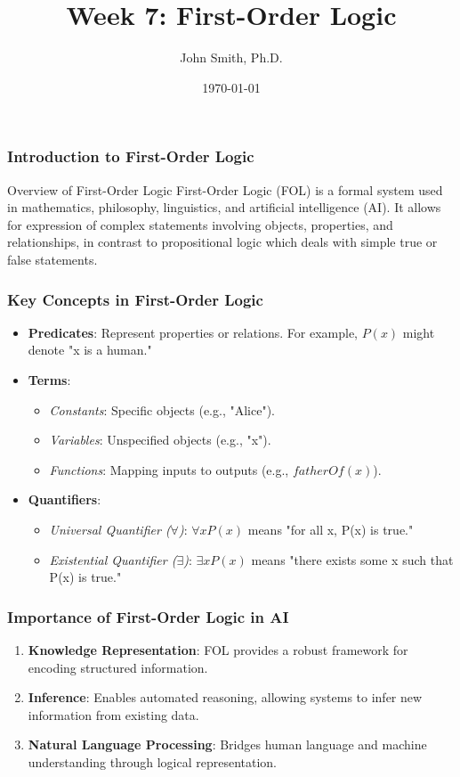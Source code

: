 \documentclass[aspectratio=169]{beamer}
\title[Week 7: First-Order Logic]{Week 7: First-Order Logic}
\author[J. Smith]{John Smith, Ph.D.}
\institute[University Name]{
  Department of Computer Science\\
  University Name\\
  \vspace{0.3cm}
  Email: email@university.edu\\
  Website: www.university.edu
}
\date{\today}
\begin{document}
\frame{\titlepage}

\begin{frame}[fragile]
    \frametitle{Introduction to First-Order Logic}
    \begin{block}{Overview of First-Order Logic}
        First-Order Logic (FOL) is a formal system used in mathematics, philosophy, linguistics, and artificial intelligence (AI). It allows for expression of complex statements involving objects, properties, and relationships, in contrast to propositional logic which deals with simple true or false statements.
    \end{block}
\end{frame}

\begin{frame}[fragile]
    \frametitle{Key Concepts in First-Order Logic}
    \begin{itemize}
        \item \textbf{Predicates}: Represent properties or relations. For example, $P(x)$ might denote "x is a human."
        \item \textbf{Terms}:
            \begin{itemize}
                \item \textit{Constants}: Specific objects (e.g., "Alice").
                \item \textit{Variables}: Unspecified objects (e.g., "x").
                \item \textit{Functions}: Mapping inputs to outputs (e.g., $fatherOf(x)$).
            \end{itemize}
        \item \textbf{Quantifiers}:
            \begin{itemize}
                \item \textit{Universal Quantifier ($\forall$)}: $\forall x P(x)$ means "for all x, P(x) is true."
                \item \textit{Existential Quantifier ($\exists$)}: $\exists x P(x)$ means "there exists some x such that P(x) is true."
            \end{itemize}
    \end{itemize}
\end{frame}

\begin{frame}[fragile]
    \frametitle{Importance of First-Order Logic in AI}
    \begin{enumerate}
        \item \textbf{Knowledge Representation}: FOL provides a robust framework for encoding structured information.
        \item \textbf{Inference}: Enables automated reasoning, allowing systems to infer new information from existing data.
        \item \textbf{Natural Language Processing}: Bridges human language and machine understanding through logical representation.
    \end{enumerate}
\end{frame}
\end{document}

